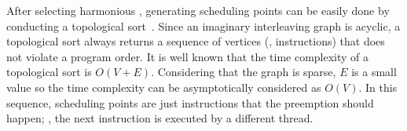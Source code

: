 %
After selecting harmonious \segments, generating scheduling points can
be easily done by conducting a topological
sort~\cite{topologicalsort}.
%
Since an imaginary interleaving graph is acyclic, a topological sort
always returns a sequence of vertices (\ie, instructions) that does
not violate a program order.
%
It is well known that the time complexity of a topological sort is
$O(V+E)$. Considering that the graph is sparse, $E$ is a small value
so the time complexity can be asymptotically considered as $O(V)$.
%
In this sequence, scheduling points are just instructions that the
preemption should happen; \ie, the next instruction is executed by a
different thread.
%




